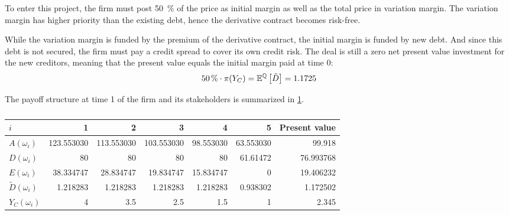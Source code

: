 \documentclass[../main.tex]{subfiles}
\begin{document}
        To enter this project, the firm must post \qty[round-precision=0]{50}{\percent}
        of the price as initial margin as well as the total price in variation margin.
        The variation margin has higher priority than the existing debt, hence the derivative contract becomes risk-free.

        While the variation margin is funded by the premium of the derivative contract, the initial margin is funded by new debt. And since this debt is not secured, the firm must pay a credit spread to cover its own credit risk. The deal is still a zero net present value investment for the new creditors, meaning that the present value equals the initial margin paid at time 0:
        \begin{equation}
            \qty[round-precision=0]{50}{\percent} 
            \cdot 
            \pi(Y_C) = \mathbb{E}^{\rnmeasure}\left[\tilde{D}\right] = \num{1.1725}
        \end{equation}

        The payoff structure at time 1 of the firm and its stakeholders
        is summarized in \cref{tbl:example-collateralized-derivative}.

        \begin{table}[H]
            \centering
            \begin{tabular}{l|rrrrr||r}
                $i$ & 1 & 2 & 3 & 4 & 5 & Present value \\
                \hline
                $A(\omega_{i})$ & 
                    \num{123.553030} & \num{113.553030} & \num{103.553030} & \num{98.553030} & \num{63.553030} & \num{99.918} \\
                $D(\omega_{i})$ & 
                    \num{80} & \num{80} & \num{80} & \num{80} & \num{61.61472} & \num{76.993768} \\
                $E(\omega_{i})$ & 
                    \num{38.334747} & \num{28.834747} & \num{19.834747} & \num{15.834747} & \num{0} & \num{19.406232} \\
                $\tilde{D}(\omega_{i})$ & 
                    \num{1.218283} & \num{1.218283} & \num{1.218283} & \num{1.218283} & \num{0.938302} & \num{1.172502} \\
                $Y_C(\omega_{i})$ & 
                    \num{4} & \num{3.5} & \num{2.5} & \num{1.5} & \num{1} & \num{2.345} \\
            \end{tabular}
            \caption{}
            \label{tbl:example-collateralized-derivative}
        \end{table}
\end{document}
